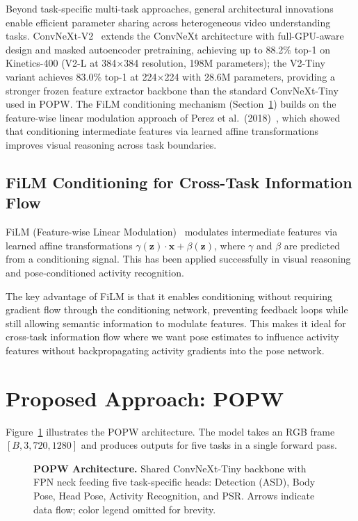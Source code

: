 \documentclass[11pt,a4paper]{article}
\newcommand{\popw}{POPW}
\begin{document}
Beyond task-specific multi-task approaches, general architectural innovations enable efficient parameter sharing across heterogeneous video understanding tasks. ConvNeXt-V2~\cite{liu2022convnet,mao2024convnextv2} extends the ConvNeXt architecture with full-GPU-aware design and masked autoencoder pretraining, achieving up to 88.2\% top-1 on Kinetics-400 (V2-L at 384$\times$384 resolution, 198M parameters); the V2-Tiny variant achieves 83.0\% top-1 at 224$\times$224 with 28.6M parameters, providing a stronger frozen feature extractor backbone than the standard ConvNeXt-Tiny used in POPW. The FiLM conditioning mechanism (Section~\ref{sec:method}) builds on the feature-wise linear modulation approach of Perez et al.~(2018)~\cite{perez2018film}, which showed that conditioning intermediate features via learned affine transformations improves visual reasoning across task boundaries.

\subsection{FiLM Conditioning for Cross-Task Information Flow}

FiLM (Feature-wise Linear Modulation)~\cite{dumoulin2016learned} modulates intermediate features via learned affine transformations $\gamma(\mathbf{z}) \cdot \mathbf{x} + \beta(\mathbf{z})$, where $\gamma$ and $\beta$ are predicted from a conditioning signal. This has been applied successfully in visual reasoning~\cite{perez2018film} and pose-conditioned activity recognition.

The key advantage of FiLM is that it enables conditioning without requiring gradient flow through the conditioning network, preventing feedback loops while still allowing semantic information to modulate features. This makes it ideal for cross-task information flow where we want pose estimates to influence activity features without backpropagating activity gradients into the pose network.

\section{Proposed Approach: \popw{}}
\label{sec:method}

Figure~\ref{fig:architecture} illustrates the \popw{} architecture. The model takes an RGB frame $[B, 3, 720, 1280]$ and produces outputs for five tasks in a single forward pass.

\begin{figure}[htbp]
\centering
{}
\caption{\textbf{POPW Architecture.} Shared ConvNeXt-Tiny backbone with FPN neck feeding five task-specific heads: Detection (ASD), Body Pose, Head Pose, Activity Recognition, and PSR. Arrows indicate data flow; color legend omitted for brevity.}
\label{fig:architecture}
\end{figure}
\end{document}
